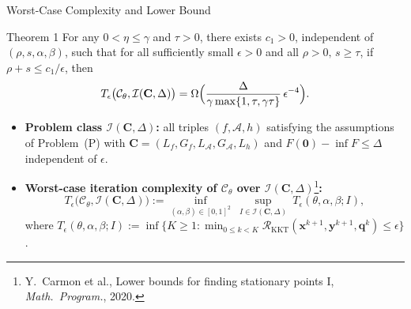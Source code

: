 \documentclass[10pt]{beamer}
\newcommand{\red}[1]{{\color[rgb]{1,0,0}{#1}}}
\newcommand{\bx}{\mathbf{x}}
\newcommand{\by}{\mathbf{y}}
\newcommand{\bq}{\mathbf{q}}
\newcommand{\zero}{\mathbf{0}}
\newcommand{\calA}{\mathcal{A}}
\newcommand{\calC}{\mathcal{C}}
\begin{document}
\begin{frame}{Worst-Case Complexity and Lower Bound}
\small
\begin{block}{Theorem 1}
For any $0<\eta\le\gamma$ and $\tau>0$, there exists $c_1>0$, independent of $(\rho,s,\alpha,\beta)$, such that for all sufficiently small $\epsilon>0$ and all $\rho>0,\,s\ge\tau$, if $\rho+s\le c_1/\epsilon$, then
\[
    T_\epsilon\bigl(\calC_\theta,\mathcal I(\mathbf C,\Delta)\bigr)=\Omega\Bigl(\frac{\Delta}{\gamma\max\{1,\tau,\gamma\tau\}}\,\epsilon^{-4}\Bigr).
\]
\end{block}

\begin{itemize}\setlength{\itemsep}{4pt}
    \item \textbf{Problem class $\mathcal I(\mathbf C,\Delta)$:} all triples $(f,\calA,h)$ satisfying the assumptions of Problem~(P)
    with $\mathbf C=(L_f,G_f,L_{\calA},G_{\calA},L_h)$ and $F(\zero)-\inf F\le\Delta$ independent of $\epsilon$.
    \item \textbf{Worst-case iteration complexity of $\calC_\theta$ over $\mathcal I(\mathbf C,\Delta)$}\footnote{Y.~Carmon et al., Lower bounds for finding stationary points I, \emph{Math.\ Program.}, 2020.}\textbf{:}
    \[
        T_\epsilon\bigl(\calC_\theta,\mathcal I(\mathbf C,\Delta)\bigr)
        :=\inf_{(\alpha,\beta)\in[0,1]^2}\ \sup_{I\in\mathcal I(\mathbf C,\Delta)}\ T_\epsilon(\theta,\alpha,\beta;I),
    \]
    where $T_\epsilon(\theta,\alpha,\beta;I):=\inf\bigl\{K\ge 1:\min_{0\le k<K}\mathcal R_{\mathrm{KKT}}(\bx^{k+1},\by^{k+1},\bq^k)\le\epsilon\bigr\}$.
\end{itemize}

\end{frame}
\end{document}
